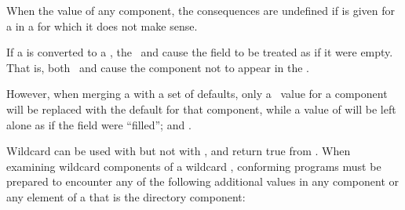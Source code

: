 When  the value of any  component,
the consequences are undefined if  is given 
for a  in a  for which it does not make sense.



If a  is converted to a , 
the  \nil\ and 
cause the field to be treated as if it were empty.
That is,
both \nil\ and  
cause the component not to appear in the .

However, when merging a  with a set of defaults,
only a \nil\ value for a component 
will be replaced with the default for that component, 
while a value of 
will be left alone as if the field were ``filled'';
 and \secref\MergingPathnames.

\endsubsubsubsubsection%

\endsubsubsubsection%

\endsubsubsection%

\endsubsubsection%


  Wildcard  can be used with  but not with 
  ,
  and return true from . When examining
  wildcard components of a wildcard , conforming programs
  must be prepared to encounter any of the following additional values
  in any component or any element of a  that is the directory component:
 
\beginlist

